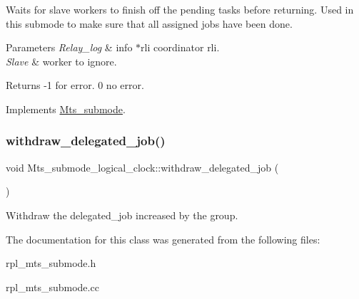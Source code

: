 Waits for slave workers to finish off the pending tasks before returning. Used in this submode to make sure that all assigned jobs have been done.


\begin{DoxyParams}{Parameters}
{\em Relay\+\_\+log} & info $\ast$rli coordinator rli. \\
\hline
{\em Slave} & worker to ignore. \\
\hline
\end{DoxyParams}
\begin{DoxyReturn}{Returns}
-\/1 for error. 0 no error. 
\end{DoxyReturn}


Implements \mbox{\hyperlink{classMts__submode}{Mts\+\_\+submode}}.

\mbox{\label{classMts__submode__logical__clock_ab1f42bc5a3528849c24ffd45b8b25aca}} 
\subsubsection{\texorpdfstring{withdraw\+\_\+delegated\+\_\+job()}{withdraw\_delegated\_job()}}
{\footnotesize\ttfamily void Mts\+\_\+submode\+\_\+logical\+\_\+clock\+::withdraw\+\_\+delegated\+\_\+job (\begin{DoxyParamCaption}{ }\end{DoxyParamCaption})\hspace{0.3cm}{\ttfamily [inline]}}

Withdraw the delegated\+\_\+job increased by the group. 

The documentation for this class was generated from the following files\+:\begin{DoxyCompactItemize}
\item 
rpl\+\_\+mts\+\_\+submode.\+h\item 
rpl\+\_\+mts\+\_\+submode.\+cc\end{DoxyCompactItemize}
